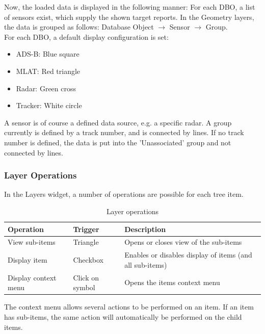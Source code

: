 \documentclass[10pt,letterpaper,extrafontsizes]{memoir}
\begin{document}
{Now, the loaded data is displayed in the following manner: For each DBO, a list of sensors exist, which supply the shown target reports. In the Geometry layers, the data is grouped as follows: Database Object $\rightarrow$ Sensor $\rightarrow$ Group. \\

For each DBO, a default display configuration is set:

\begin{itemize}
 \item ADS-B: Blue square
 \item MLAT: Red triangle
 \item Radar: Green cross
 \item Tracker: White circle
\end{itemize}

A sensor is of course a defined data source, e.g. a specific radar. A group currently is defined by a track number, and is connected by lines. If no track number is defined, the data is put into the 'Unassociated' group and not connected by lines.

\subsubsection{Layer Operations}

In the Layers widget, a number of operations are possible for each tree item.

\begin{table}[H]
  \center
  \begin{tabular}{ | l | l | l |}
    \hline
    \textbf{Operation} & \textbf{Trigger} &  \textbf{Description} \\ \hline
    View sub-items & Triangle & Opens or closes view of the sub-items \\ \hline
    Display item & Checkbox & Enables or disables display of items (and all sub-items) \\ \hline
    Display context menu & Click on symbol & Opens the items context menu \\ \hline
  \end{tabular}
  \caption{Layer operations}
\end{table}

The context menu allows several actions to be performed on an item. If an item has sub-items, the same action will automatically be performed on the child items.

}
\end{document}

